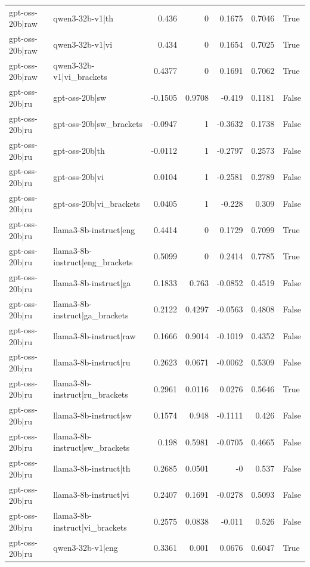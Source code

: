 \begin{table}
\begin{tabular}{l l r r r r l}
gpt-oss-20b|raw & qwen3-32b-v1|th & 0.436 & 0 & 0.1675 & 0.7046 & True \\
gpt-oss-20b|raw & qwen3-32b-v1|vi & 0.434 & 0 & 0.1654 & 0.7025 & True \\
gpt-oss-20b|raw & qwen3-32b-v1|vi_brackets & 0.4377 & 0 & 0.1691 & 0.7062 & True \\
gpt-oss-20b|ru & gpt-oss-20b|sw & -0.1505 & 0.9708 & -0.419 & 0.1181 & False \\
gpt-oss-20b|ru & gpt-oss-20b|sw_brackets & -0.0947 & 1 & -0.3632 & 0.1738 & False \\
gpt-oss-20b|ru & gpt-oss-20b|th & -0.0112 & 1 & -0.2797 & 0.2573 & False \\
gpt-oss-20b|ru & gpt-oss-20b|vi & 0.0104 & 1 & -0.2581 & 0.2789 & False \\
gpt-oss-20b|ru & gpt-oss-20b|vi_brackets & 0.0405 & 1 & -0.228 & 0.309 & False \\
gpt-oss-20b|ru & llama3-8b-instruct|eng & 0.4414 & 0 & 0.1729 & 0.7099 & True \\
gpt-oss-20b|ru & llama3-8b-instruct|eng_brackets & 0.5099 & 0 & 0.2414 & 0.7785 & True \\
gpt-oss-20b|ru & llama3-8b-instruct|ga & 0.1833 & 0.763 & -0.0852 & 0.4519 & False \\
gpt-oss-20b|ru & llama3-8b-instruct|ga_brackets & 0.2122 & 0.4297 & -0.0563 & 0.4808 & False \\
gpt-oss-20b|ru & llama3-8b-instruct|raw & 0.1666 & 0.9014 & -0.1019 & 0.4352 & False \\
gpt-oss-20b|ru & llama3-8b-instruct|ru & 0.2623 & 0.0671 & -0.0062 & 0.5309 & False \\
gpt-oss-20b|ru & llama3-8b-instruct|ru_brackets & 0.2961 & 0.0116 & 0.0276 & 0.5646 & True \\
gpt-oss-20b|ru & llama3-8b-instruct|sw & 0.1574 & 0.948 & -0.1111 & 0.426 & False \\
gpt-oss-20b|ru & llama3-8b-instruct|sw_brackets & 0.198 & 0.5981 & -0.0705 & 0.4665 & False \\
gpt-oss-20b|ru & llama3-8b-instruct|th & 0.2685 & 0.0501 & -0 & 0.537 & False \\
gpt-oss-20b|ru & llama3-8b-instruct|vi & 0.2407 & 0.1691 & -0.0278 & 0.5093 & False \\
gpt-oss-20b|ru & llama3-8b-instruct|vi_brackets & 0.2575 & 0.0838 & -0.011 & 0.526 & False \\
gpt-oss-20b|ru & qwen3-32b-v1|eng & 0.3361 & 0.001 & 0.0676 & 0.6047 & True \\

\end{tabular}
\end{table}
